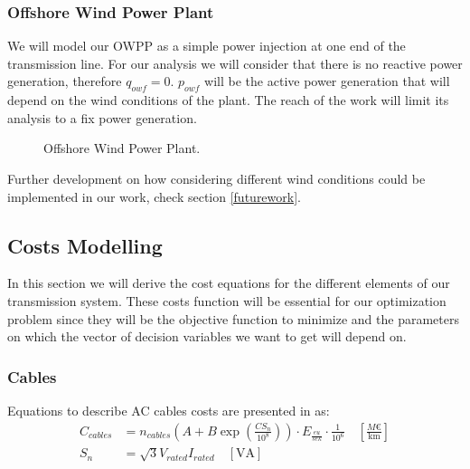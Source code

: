 \documentclass[a4paper,11pt, titlepage, twoside]{article}
\begin{document}
\subsubsection{Offshore Wind Power Plant}
We will model our OWPP as a simple power injection at one end of the transmission line. For our
analysis we will consider that there is no reactive power generation, therefore $q_{owf} = 0$. $p_{owf}$ will be the active power generation that will depend 
on the wind conditions of the plant. The reach of the work will limit its analysis to a fix power generation.
\begin{figure}[H]
\centering
{}
\caption{ Offshore Wind Power Plant.}
\label{fig:powerplant}
\end{figure}
Further development on how considering different wind conditions could be implemented in our work, check section \ref{futurework}.


\subsection{Costs Modelling}

In this section we will derive the cost equations for the different elements of our transmission system. These costs function will be essential for our optimization problem since
they will be the objective function to minimize and the parameters on which the vector of decision variables we want to get will depend on.
\subsubsection{Cables}

Equations to describe AC cables costs are presented in \cite{chalmers} as:
\begin{align}
    C_{cables} &= n_{cables} (A + B \exp(\frac{CS_n}{10^8})) \cdot E_{\frac{eu}{sek}} \cdot \frac{1}{10^6} \quad \left[\frac{M\euro}{\text{km}}\right] \\
    S_n &= \sqrt{3}V_{rated}I_{rated} \quad \left[\text{VA}\right]
\end{align}
\end{document}
